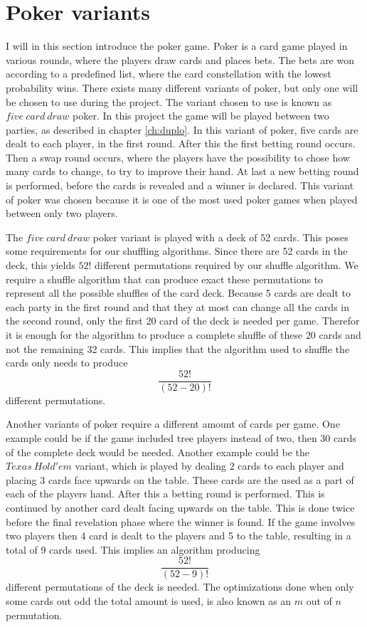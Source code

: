 \documentclass[twoside,11pt,openright]{report}
\begin{document}
\section{Poker variants}
\label{sec:poker}
I will in this section introduce the poker game. Poker is a card game played in various rounds, where the players draw cards and places bets. The bets are won according to a predefined list, where the card constellation with the lowest probability wins. There exists many different variants of poker, but only one will be chosen to use during the project. The variant chosen to use is known as $five~card~draw$ poker. In this project the game will be played between two parties, as described in chapter \ref{ch:duplo}. In this variant of poker, five cards are dealt to each player, in the first round. After this the first betting round occurs. Then a swap round occurs, where the players have the possibility to chose how many cards to change, to try to improve their hand. At last a new betting round is performed, before the cards is revealed and a winner is declared. This variant of poker was chosen because it is one of the most used poker games when played between only two players.

The $five~card~draw$ poker variant is played with a deck of 52 cards. This poses some requirements for our shuffling algorithms. Since there are 52 cards in the deck, this yields $52!$ different permutations required by our shuffle algorithm. We require a shuffle algorithm that can produce exact these permutations to represent all the possible shuffles of the card deck. Because 5 cards are dealt to each party in the first round and that they at most can change all the cards in the second round, only the first 20 card of the deck is needed per game. Therefor it is enough for the algorithm to produce a complete shuffle of these $20$ cards and not the remaining 32 cards. This implies that the algorithm used to shuffle the cards only needs to produce $$\frac{52!}{(52-20)!}$$ different permutations. 

Another variants of poker require a different amount of cards per game. One example could be if the game included tree players instead of two, then 30 cards of the complete deck would be needed. Another example could be the $Texas~Hold'em$ variant, which is played by dealing $2$ cards to each player and placing $3$ cards face upwards on the table. These cards are the used as a part of each of the players hand. After this a betting round is performed. This is continued by another card dealt facing upwards on the table. This is done twice before the final revelation phase where the winner is found. If the game involves two players then 4 card is dealt to the players and 5 to the table, resulting in a total of 9 cards used. This implies an algorithm producing $$\frac{52!}{(52-9)!}$$ different permutations of the deck is needed. The optimizations done when only some cards out odd the total amount is used, is also known as an $m$ out of $n$ permutation.
\end{document}

